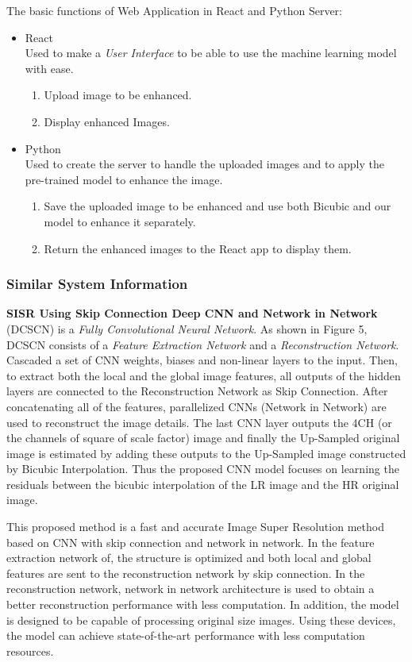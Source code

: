 \documentclass[12pt]{article}
\begin{document}
				The basic functions of Web Application in React and Python Server:
				\begin{itemize}
					\item React\\
						Used to make a \textit{User Interface} to be able to use the machine learning model with ease.
						\begin{enumerate}
							\item Upload image to be enhanced.
							\item Display enhanced Images.
						\end{enumerate}
					\item Python\\
						Used to create the server to handle the uploaded images and to apply the pre-trained model to enhance the image.
						\begin{enumerate}
							\item Save the uploaded image to be enhanced and use both Bicubic and our model to enhance it separately.
							\item Return the enhanced images to the React app to display them.
						\end{enumerate}
				\end{itemize}
			\subsubsection{Similar System Information}
				\textbf{SISR Using Skip Connection Deep CNN and Network in Network} (DCSCN)\cite{30} is a \textit{Fully Convolutional Neural Network}. As shown in Figure 5, DCSCN consists of a \textit{Feature Extraction Network} and a \textit{Reconstruction Network}. Cascaded a set of CNN weights, biases and non-linear layers to the input. Then, to extract both the local and the global image features, all outputs of the hidden layers are connected to the Reconstruction Network as Skip Connection. After concatenating all of the features, parallelized CNNs (Network in Network) are used to reconstruct the image details. The last CNN layer outputs the 4CH (or the channels of square of scale factor) image and finally the Up-Sampled original image is estimated by adding these outputs to the Up-Sampled image constructed by Bicubic Interpolation. Thus the proposed CNN model focuses on learning the residuals between the bicubic interpolation of the LR image and the HR original image.
				
				This proposed method is a fast and accurate Image Super Resolution method based on 	CNN with skip connection and network in network. In the feature extraction network of, the structure is optimized and both local and global features are sent to the	reconstruction network by skip connection. In the reconstruction network, network in network architecture is used to obtain a better reconstruction performance with less computation. In addition, the model is designed to be capable of processing original size images. Using these devices, the model can achieve state-of-the-art performance	with less computation resources.
\end{document}
